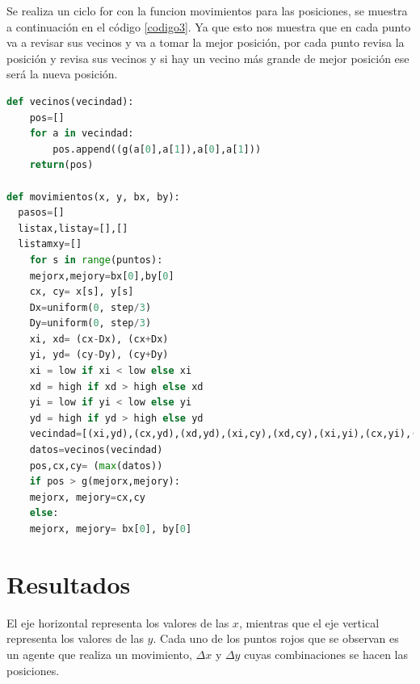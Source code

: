 \documentclass{article}
\begin{document}
Se realiza un ciclo for con la funcion movimientos para las posiciones, se muestra a continuación en el código \ref{codigo3}. Ya que esto nos muestra que en cada punto va a revisar sus vecinos y va a tomar la mejor posición, por cada punto revisa la posición y revisa sus vecinos y si hay un vecino más grande de mejor posición ese será la nueva posición.

\begin{lstlisting}[caption=Ejecución de códigos para los vecinos y posiciones, label=codigo3, language=Python]
def vecinos(vecindad):
    pos=[]
    for a in vecindad:
        pos.append((g(a[0],a[1]),a[0],a[1]))
    return(pos)
    
def movimientos(x, y, bx, by):
  pasos=[]
  listax,listay=[],[]
  listamxy=[]
    for s in range(puntos):
    mejorx,mejory=bx[0],by[0]
    cx, cy= x[s], y[s]
    Dx=uniform(0, step/3)
    Dy=uniform(0, step/3)
    xi, xd= (cx-Dx), (cx+Dx)
    yi, yd= (cy-Dy), (cy+Dy)
    xi = low if xi < low else xi
    xd = high if xd > high else xd
    yi = low if yi < low else yi
    yd = high if yd > high else yd
    vecindad=[(xi,yd),(cx,yd),(xd,yd),(xi,cy),(xd,cy),(xi,yi),(cx,yi),(xd,yi)]
    datos=vecinos(vecindad)
    pos,cx,cy= (max(datos))
    if pos > g(mejorx,mejory):
    mejorx, mejory=cx,cy
    else:
    mejorx, mejory= bx[0], by[0]
\end{lstlisting}

\section{Resultados}\label{res}

El eje horizontal representa los valores de las $x$, mientras que el eje vertical representa los valores de las $y$. Cada uno de los puntos rojos que se observan es un agente que realiza un movimiento, $\Delta x$ y $\Delta y$ cuyas combinaciones se hacen las posiciones. 
\end{document}
